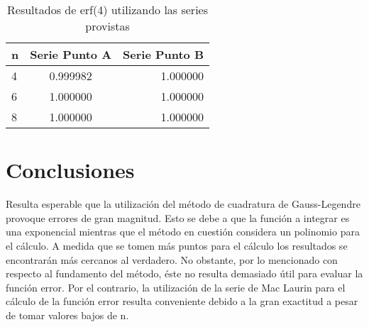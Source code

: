 \documentclass[a4paper]{article}
\begin{document}
\begin{table}[!ht]
\centering
\begin{tabular}{l c  r}
\hline
n & Serie Punto A & Serie Punto B \\ \hline
4 & 0.999982 & 1.000000\\
6 & 1.000000 & 1.000000\\
8 & 1.000000 & 1.000000\\ \hline
\end{tabular}
\caption{Resultados de erf(4) utilizando las series provistas}
\end{table}

\section{Conclusiones}

Resulta esperable que la utilización del método de cuadratura de Gauss-Legendre provoque errores de gran magnitud. Esto se debe a que la función a integrar es una exponencial mientras que el método en cuestión considera un polinomio para el cálculo. A medida que se tomen más puntos para el cálculo los resultados se encontrarán más cercanos al verdadero. No obstante, por lo mencionado con respecto al fundamento del método, éste no resulta demasiado útil para evaluar la función error.
Por el contrario, la utilización de la serie de Mac Laurin para el cálculo de la función error resulta conveniente debido a la gran exactitud a pesar de tomar valores bajos de n.
\end{document}
